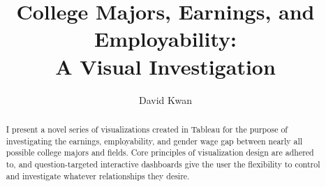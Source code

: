 \documentclass[sigchi]{acmart}
\begin{document}
\title{College Majors, Earnings, and Employability:\\ A Visual Investigation}

\author{David Kwan}


\begin{abstract}
 I present a novel series of visualizations created in Tableau for the purpose of investigating the earnings, employability, and gender wage gap between nearly all possible college majors and fields. Core principles of visualization design are adhered to, and question-targeted interactive dashboards give the user the flexibility to control and investigate whatever relationships they desire. 
\end{abstract}

\end{document}
